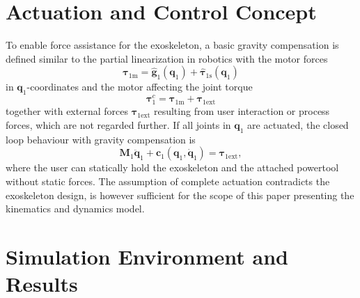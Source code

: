\documentclass[letterpaper, 10 pt, conference]{ieeeconf}  %
\begin{document}
%

\section{Actuation and Control Concept}

To enable force assistance for the exoskeleton, a basic gravity compensation is defined similar to the partial linearization in robotics with the motor forces
%
\begin{equation}
\bm{\tau}_{1\mathrm{m}} = \hat{\bm{g}}_1(\bm{q}_1) + \hat{\bm{\tau}}_{1\mathrm{s}}(\bm{q}_1)
\label{equ:GravKomp}
\end{equation}
%
in $\bm{q}_1$-coordinates and the motor affecting the joint torque
%
\begin{equation}
\bm{\tau}^c_1 = \bm{\tau}_{1\mathrm{m}} + \bm{\tau}_{1\mathrm{ext}}
\label{equ:JointTorque}
\end{equation}
%
together with external forces $\bm{\tau}_{1\mathrm{ext}}$ resulting from user interaction or process forces, which are not regarded further.
If all joints in $\bm{q}_1$ are actuated, the closed loop behaviour with gravity compensation is
%
\begin{equation}
\bm{M}_1\ddot{\bm{q}}_1+\bm{c}_1(\bm{q}_1,\dot{\bm{q}}_1) = \bm{\tau}_{1\mathrm{ext}},
\label{equ:closedloop}
\end{equation}
%
where the user can statically hold the exoskeleton and the attached powertool without static forces.
The assumption of complete actuation contradicts the exoskeleton design, is however sufficient for the scope of this paper presenting the kinematics and dynamics model.

\section{Simulation Environment and Results}
\end{document}
